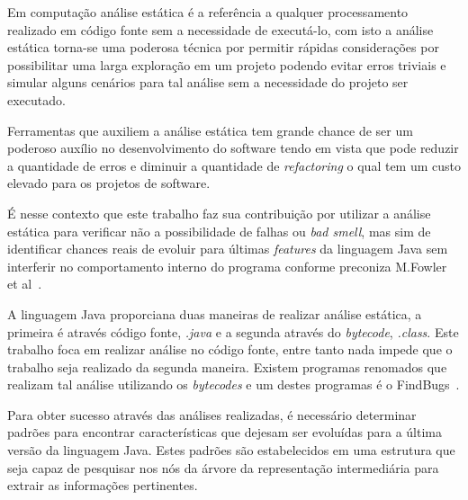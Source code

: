 Em computa\c{c}\~{a}o an\'{a}lise est\'{a}tica \'{e} a refer\^{e}ncia a qualquer processamento realizado em c\'{o}digo fonte sem a necessidade de execut\'{a}-lo, com isto a an\'{a}lise est\'{a}tica torna-se uma poderosa t\'{e}cnica por permitir r\'{a}pidas considera\c{c}\~{o}es por possibilitar uma larga explora\c{c}\~{a}o em um projeto podendo evitar erros triviais e simular alguns cen\'{a}rios para tal an\'{a}lise sem a necessidade do projeto ser executado.

Ferramentas que auxiliem a an\'{a}lise est\'{a}tica tem grande chance de ser um poderoso aux\'{i}lio no desenvolvimento do software tendo em vista que pode reduzir a quantidade de erros e diminuir a quantidade de \textit{refactoring} o qual tem um custo elevado para os projetos de software.

\'{E} nesse contexto que este trabalho faz sua contribui\c{c}\~{a}o por utilizar a an\'{a}lise est\'{a}tica para verificar n\~{a}o a possibilidade de falhas ou \textit{bad smell}, mas sim de identificar chances reais de evoluir para \'{u}ltimas \textit{features} da linguagem Java sem interferir no comportamento interno do programa conforme preconiza M.Fowler et al~\cite{martinFowlerRafactoring}.

A linguagem Java proporciana duas maneiras de realizar an\'{a}lise est\'{a}tica, a primeira \'{e} através c\'{o}digo fonte, \textit{.java} e a segunda atrav\'{e}s do \textit{bytecode}, \textit{.class}. Este trabalho foca em realizar an\'{a}lise no c\'{o}digo fonte, entre tanto nada impede que o trabalho seja realizado da segunda maneira. Existem programas renomados que realizam tal an\'{a}lise utilizando os \textit{bytecodes} e um destes programas \'{e} o FindBugs~\cite{FindBugs}.


Para obter sucesso atrav\'{e}s das an\'{a}lises realizadas, \'{e} necess\'{a}rio determinar padr\~{o}es para encontrar caracter\'{i}sticas que dejesam ser evolu\'{i}das para a \'{u}ltima vers\~{a}o da linguagem Java. Estes padr\~{o}es s\~{a}o estabelecidos em uma estrutura que seja capaz de pesquisar nos n\'{o}s da \'{a}rvore da representa\c{c}\~{a}o intermedi\'{a}ria para extrair as informa\c{c}\~{o}es pertinentes.

